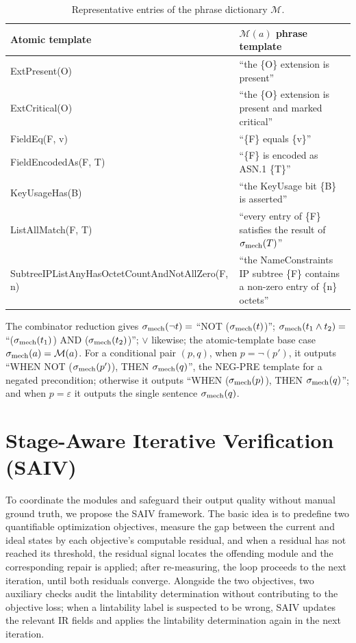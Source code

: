 \begin{table}[tb]
\centering
\footnotesize
\caption{Representative entries of the phrase dictionary $\mathcal{M}$.}
\label{tab:phrasedict}
\begin{tabularx}{\columnwidth}{@{}p{3.1cm} X@{}}
\toprule
Atomic template & $\mathcal{M}(a)$ phrase template \\
\midrule
ExtPresent(O) & ``the \{O\} extension is present'' \\
ExtCritical(O) & ``the \{O\} extension is present and marked
  critical'' \\
FieldEq(F, v) & ``\{F\} equals \{v\}'' \\
FieldEncodedAs(F, T) & ``\{F\} is encoded as ASN.1 \{T\}'' \\
KeyUsageHas(B) & ``the KeyUsage bit \{B\} is asserted'' \\
ListAllMatch(F, T) & ``every entry of \{F\} satisfies
  the result of $\sigma_{\mathrm{mech}}(T)$'' \\
SubtreeIPListAny\-HasOctetCount\-AndNotAllZero(F, n) & ``the
  NameConstraints IP subtree \{F\} contains a non-zero entry of \{n\}
  octets'' \\
\bottomrule
\end{tabularx}
\end{table}

The combinator reduction gives $\sigma_{\mathrm{mech}}(\neg t) = $ ``NOT ($\sigma_{\mathrm{mech}}(t)$)'';
$\sigma_{\mathrm{mech}}(t_1 \wedge t_2) = $ ``($\sigma_{\mathrm{mech}}(t_1)$) AND ($\sigma_{\mathrm{mech}}(t_2)$)''; $\vee$
likewise; the atomic-template base case $\sigma_{\mathrm{mech}}(a) = \mathcal{M}(a)$. For a
conditional pair $(p,q)$, when $p = \neg(p')$, it outputs ``WHEN NOT
($\sigma_{\mathrm{mech}}(p')$), THEN $\sigma_{\mathrm{mech}}(q)$'', the NEG-PRE template for a negated
precondition; otherwise it outputs ``WHEN ($\sigma_{\mathrm{mech}}(p)$), THEN $\sigma_{\mathrm{mech}}(q)$''; and
when $p = \varepsilon$ it outputs the single sentence $\sigma_{\mathrm{mech}}(q)$.

\section{Stage-Aware Iterative Verification (SAIV)}
\label{sec:saiv}

To coordinate the modules and safeguard their output quality without manual
ground truth, we propose the SAIV framework.
The basic idea is to predefine two quantifiable optimization
objectives, measure the gap between the current and ideal states by each
objective's computable residual, and when a residual has not reached its
threshold, the residual signal locates the offending module
and the corresponding repair is applied; after re-measuring, the loop proceeds
to the next iteration, until both residuals converge. Alongside the two objectives, two
auxiliary checks audit the lintability determination without contributing to the
objective loss; when a lintability label is suspected to be wrong, SAIV updates
the relevant IR fields and applies the lintability determination again in the next
iteration.

